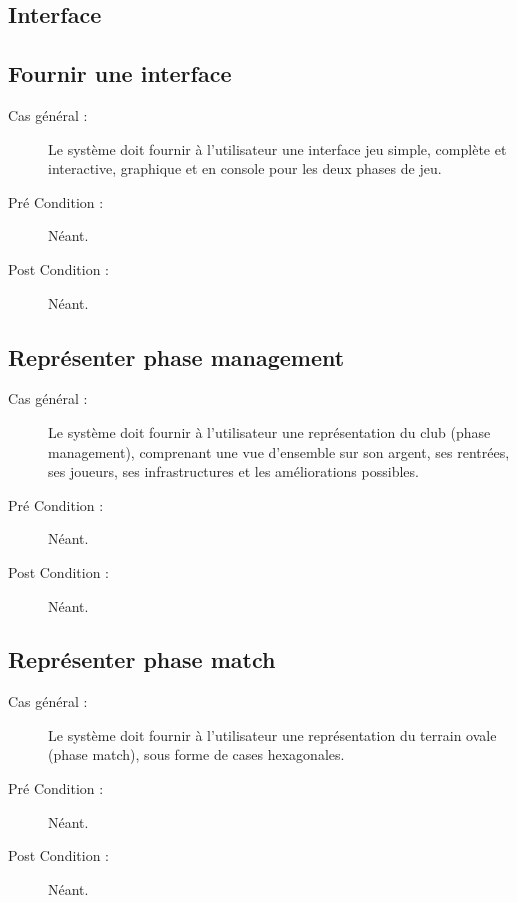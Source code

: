 \documentclass[a4paper]{report}
\begin{document}
\subsection{Interface}
\subsection{Fournir une interface}
\begin{description}
    \item[Cas général :] Le système doit fournir à l'\gls{utilisateur} une interface jeu simple, complète et interactive, graphique et en console pour les deux phases de jeu.
    \item[Pré Condition  :] Néant.
    \item[Post Condition :] Néant.
\end{description}

\subsection{Représenter phase management}
\begin{description}
    \item[Cas général :] Le système doit fournir à l'\gls{utilisateur} une représentation du \gls{club} (phase management), comprenant une vue d'ensemble sur son argent, ses rentrées, ses \glspl{joueur}, ses infrastructures et les améliorations possibles.
    \item[Pré Condition  :] Néant.
    \item[Post Condition :] Néant.
\end{description}

\subsection{Représenter phase match}
\begin{description}
    \item[Cas général :] Le système doit fournir à l'\gls{utilisateur} une représentation du terrain ovale (phase match), sous forme de cases hexagonales.
    \item[Pré Condition  :] Néant.
    \item[Post Condition :] Néant.
\end{description}
\end{document}

